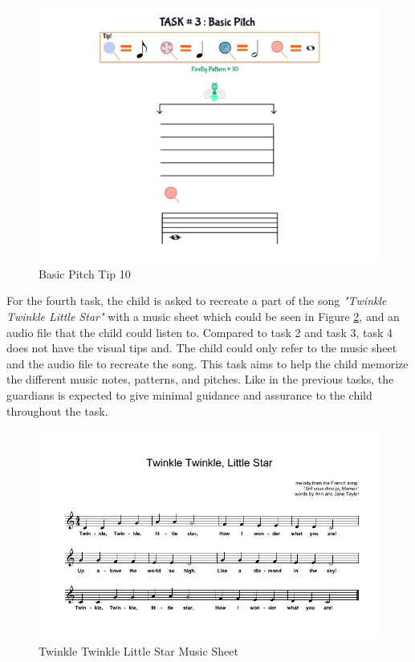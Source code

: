 \begin{figure}[H]
    \centering
    \includegraphics[width=12cm]{figures/NewFigures/BasicPitchTip10.png}
    \caption{Basic Pitch Tip 10}
    \label{fig:BasicPitchTip10}
\end{figure}

For the fourth task, the child is asked to recreate a part of the song \textit{"Twinkle Twinkle Little Star"} with a music sheet which could be seen in Figure \ref{fig:TTLSMusicSheet}, and an audio file that the child could listen to. Compared to task 2 and task 3, task 4 does not have the visual tips and. The child could only refer to the music sheet and the audio file to recreate the song. This task aims to help the child memorize the different music notes, patterns, and pitches. Like in the previous tasks, the guardians is expected to give minimal guidance and assurance to the child throughout the task. 

\begin{figure}[H!]
    \centering
    \includegraphics[width=15cm]{figures/NewFigures/TwinkleTwinkleLittleStarMusicSheet.png}
    \caption{Twinkle Twinkle Little Star Music Sheet}
    \label{fig:TTLSMusicSheet}
\end{figure}

